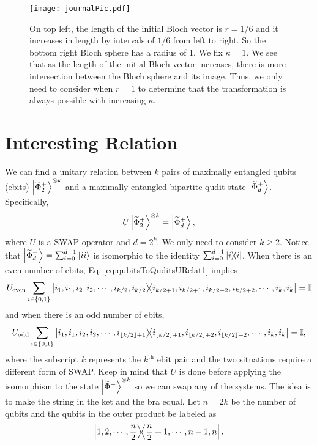 \documentclass[12pt]{iopart}
\begin{document}
\begin{figure}[h]
    \centering
    \texttt{[image: journalPic.pdf]}
    \caption{On top left, the length of the initial Bloch vector is $r=1/6$ and it increases in length by intervals of $1/6$ from left to right. So the bottom right Bloch sphere has a radius of 1. We fix $\kappa = 1$. We see that as the length of the initial Bloch vector increases, there is more intersection between the Bloch sphere and its image. Thus, we only need to consider when $r=1$ to determine that the transformation is always possible with increasing $\kappa$.}
    \label{fig:ncpInfMap}
\end{figure}

\section{Interesting Relation}
\label{App:2}

    We can find a unitary relation between $k$ pairs of maximally entangled qubits (ebits) $\ket{\widetilde{\Phi}^+_2}^{\otimes k}$ and a maximally entangled bipartite qudit state $\ket{\widetilde\Phi^+_d}$. Specifically,
    \begin{align}\label{eq:qubitsToQuditsURelat1}
        U\ket{\widetilde{\Phi}^+_2}^{\otimes k}=\ket{\widetilde\Phi^+_d},
    \end{align}
    where $U$ is a SWAP operator and $d=2^{k}$. We only need to consider $k\geq2$. Notice that $\ket{\widetilde\Phi^+_d}=\sum_{i=0}^{d-1}\ket{ii}$ is isomorphic to the identity $\sum_{i=0}^{d-1}\op{i}$. When there is an even number of ebits, Eq. \eqref{eq:qubitsToQuditsURelat1} implies
    \begin{align}
        U_{\text{even}} \sum_{i\in \{ 0, 1 \}} \op{i_1,i_1, i_2, i_2,\cdots, i_{k/2}, i_{k/2}}{i_{k/2+1},i_{k/2+1},i_{k/2+2},i_{k/2+2},\cdots, i_{k}, i_{k}}=\mathbb{I}
    \end{align}
    and when there is an odd number of ebits,
    \begin{align}
    \label{Eq:n_not_divisible_by_4}
        U_{\text{odd}} \sum_{i \in \{ 0, 1 \}} \op{i_1,i_1,i_2, i_2,\cdots, i_{\lfloor k/2 \rfloor +1}}{i_{\lfloor k/2 \rfloor +1},i_{\lfloor k/2 \rfloor +2},i_{\lfloor k/2 \rfloor +2},\cdots, i_{k}, i_{k}}= \mathbb{I},
    \end{align}
    where the subscript $k$ represents the $k^\text{th}$ ebit pair and the two situations require a different form of SWAP. Keep in mind that $U$ is done before applying the isomorphism to the state $\ket{\widetilde{\Phi}^+}^{\otimes k}$ so we can swap any of the systems. The idea is to make the string in the ket and the bra equal. Let $n=2k$ be the number of qubits and the qubits in the outer product be labeled as
    \begin{align}
        \op{1, 2, \cdots, \dfrac{n}{2}}{\dfrac{n}{2}+1, \cdots, n-1, n}.
    \end{align}
    
\end{document}
